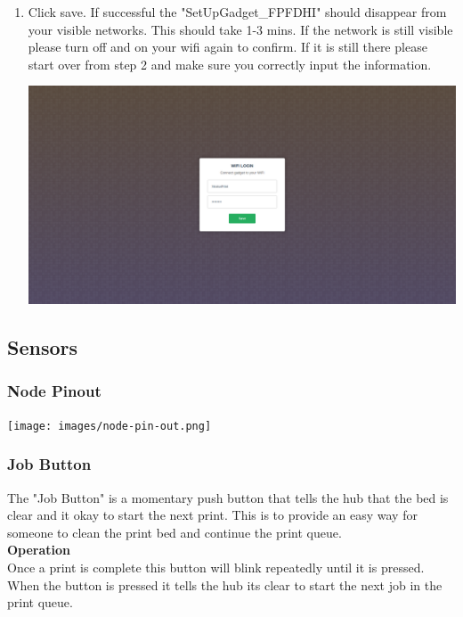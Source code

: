 \begin{enumerate}
      \item Click save. If successful the "SetUpGadget\_FPFDHI" should disappear
      from your visible networks. This should take 1-3 mins. If the network is still
      visible please turn off and on your wifi again to confirm. If it is still there
      please start over from step 2 and make sure you correctly input the information.
      \begin{center}
      \includegraphics[scale=0.25]{images/wifi-login.png}
    \end{center}
    \end{enumerate}

  \subsection{Sensors}
  \subsubsection{Node Pinout}
  \begin{center}
        \texttt{[image: images/node-pin-out.png]}
  \end{center}
    \subsubsection{Job Button}
      The "Job Button" is a momentary push button that tells the hub that the bed
      is clear and it okay to start the next print. This is to provide an easy way
      for someone to clean the print bed and continue the print queue.\\

      \textbf{Operation}\\
      Once a print is complete this button will blink repeatedly until it is pressed.
      When the button is pressed it tells the hub its clear to start the next job in the
      print queue.\\

